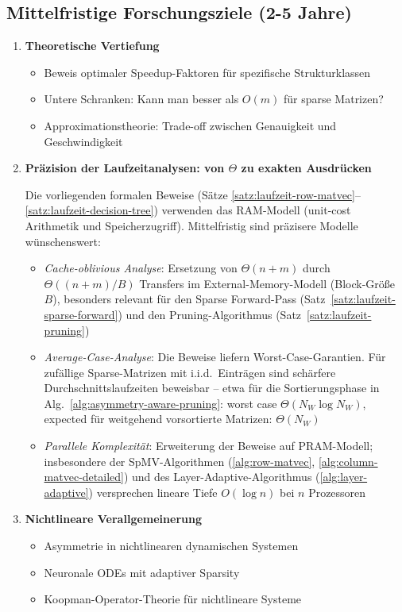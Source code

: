 \documentclass[a4paper,12pt]{report}
\theoremstyle{definition}
\begin{document}
	\subsection{Mittelfristige Forschungsziele (2-5 Jahre)}
	
	\begin{enumerate}
		\item \textbf{Theoretische Vertiefung}
		\begin{itemize}
			\item Beweis optimaler Speedup-Faktoren für spezifische Strukturklassen
			\item Untere Schranken: Kann man besser als $O(m)$ für sparse Matrizen?
			\item Approximationstheorie: Trade-off zwischen Genauigkeit und Geschwindigkeit
		\end{itemize}

		\item \textbf{Präzision der Laufzeitanalysen: von $\Theta$ zu exakten Ausdrücken}

		Die vorliegenden formalen Beweise (Sätze \ref{satz:laufzeit-row-matvec}--\ref{satz:laufzeit-decision-tree}) verwenden das RAM-Modell (unit-cost Arithmetik und Speicherzugriff). Mittelfristig sind präzisere Modelle wünschenswert:
		\begin{itemize}
			\item \emph{Cache-oblivious Analyse}: Ersetzung von $\Theta(n+m)$ durch $\Theta((n+m)/B)$ Transfers im External-Memory-Modell (Block-Größe $B$), besonders relevant für den Sparse Forward-Pass (Satz~\ref{satz:laufzeit-sparse-forward}) und den Pruning-Algorithmus (Satz~\ref{satz:laufzeit-pruning})
			\item \emph{Average-Case-Analyse}: Die Beweise liefern Worst-Case-Garantien. Für zufällige Sparse-Matrizen mit i.i.d.\ Einträgen sind schärfere Durch\-schnitts\-lauf\-zeiten beweisbar -- etwa für die Sortierungsphase in Alg.~\ref{alg:asymmetry-aware-pruning}: worst case $\Theta(N_W \log N_W)$, expected für weitgehend vorsortierte Matrizen: $\Theta(N_W)$
			\item \emph{Parallele Komplexität}: Erweiterung der Beweise auf PRAM-Modell; insbesondere der SpMV-Algorithmen (\ref{alg:row-matvec}, \ref{alg:column-matvec-detailed}) und des Layer-Adaptive-Algorithmus (\ref{alg:layer-adaptive}) versprechen lineare Tiefe $O(\log n)$ bei $n$ Prozessoren
		\end{itemize}
		
		\item \textbf{Nichtlineare Verallgemeinerung}
		\begin{itemize}
			\item Asymmetrie in nichtlinearen dynamischen Systemen
			\item Neuronale ODEs mit adaptiver Sparsity
			\item Koopman-Operator-Theorie für nichtlineare Systeme
		\end{itemize}
		

\end{enumerate}
\end{document}
